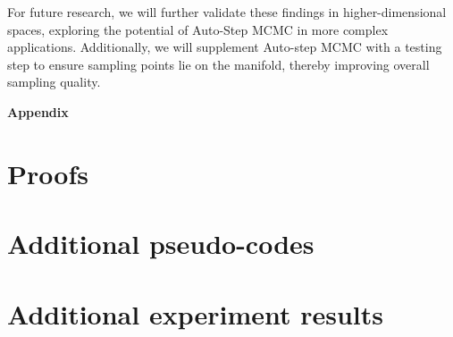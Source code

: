 \documentclass{article}
\begin{document}
For future research, we will further validate these findings in higher-dimensional spaces, exploring the potential of Auto-Step MCMC in more complex applications. Additionally, we will supplement Auto-step MCMC with a testing step to ensure sampling points lie on the manifold, thereby improving overall sampling quality.





\nocite{*}



\newpage




\clearpage
\appendix
\begin{center}
{\LARGE \textbf{Appendix}}  
\end{center}
\renewcommand{\thefigure}{\thesection.\arabic{figure}}
\renewcommand{\thetable}{\thesection.\arabic{table}}
\setcounter{figure}{0}  %
\setcounter{table}{0}   %


\section{Proofs}


\section{Additional pseudo-codes}


\section{Additional experiment results}
\end{document}
